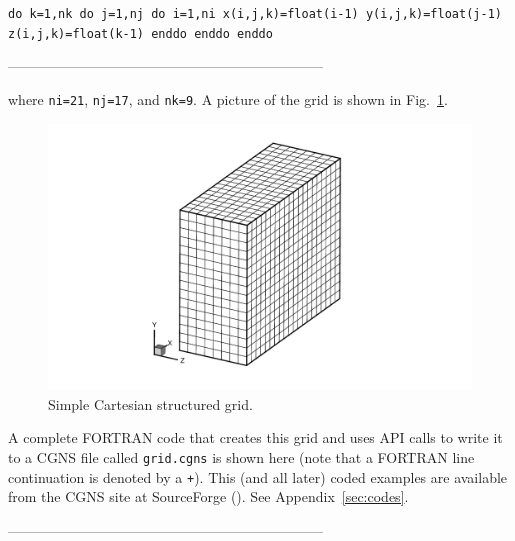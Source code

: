 \documentclass[12pt]{article}
\begin{document}
{\tt \indent         do k=1,nk
\newline\indent\indent           do j=1,nj
\newline\indent\indent\indent             do i=1,ni
\newline\indent\indent\indent\indent               x(i,j,k)=float(i-1)
\newline\indent\indent\indent\indent               y(i,j,k)=float(j-1)
\newline\indent\indent\indent\indent               z(i,j,k)=float(k-1)
\newline\indent\indent\indent             enddo
\newline\indent\indent           enddo
\newline\indent         enddo}

--------------------------------------------------------------------

\noindent where {\tt ni=21}, {\tt nj=17}, and {\tt nk=9}.  
A picture of the grid is shown in
Fig.~\ref{FIGgrid_cartesian}.

\begin{figure}[hpbt]
\centerline{{\includegraphics[width=120mm]{figures/grid_cartesian}}}
\caption{Simple Cartesian structured grid.}
\label{FIGgrid_cartesian}
\end{figure}
%

A complete FORTRAN code that creates this grid and
uses API calls to write it
to a CGNS file called {\tt grid.cgns} is shown here 
(note that a FORTRAN line continuation
is denoted by a {\tt +}).  This (and all later) coded examples
are available from the CGNS site at SourceForge
().
See Appendix~\ref{sec:codes}.

--------------------------------------------------------------------
\end{document}
